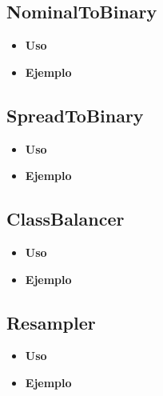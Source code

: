 	\subsection{NominalToBinary}
	\begin{justify}

	\end{justify}
	\begin{itemize}
		\item \textbf{Uso}
	\begin{justify}

	\end{justify}
		\item \textbf{Ejemplo}
	\end{itemize}
	
	\subsection{SpreadToBinary}
	\begin{justify}

	\end{justify}
	\begin{itemize}
		\item \textbf{Uso}
	\begin{justify}

	\end{justify}
		\item \textbf{Ejemplo}
	\end{itemize}
 	
	
	\subsection{ClassBalancer}
	\begin{justify}

	\end{justify}
	\begin{itemize}
		\item \textbf{Uso}
	\begin{justify}

	\end{justify}
		\item \textbf{Ejemplo}
	\end{itemize}

	\subsection{Resampler}
	\begin{justify}

	\end{justify}
	\begin{itemize}
		\item \textbf{Uso}
	\begin{justify}

	\end{justify}
		\item \textbf{Ejemplo}
	\end{itemize}


